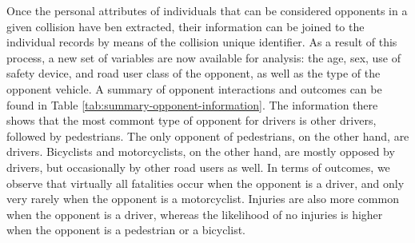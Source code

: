 \documentclass[]{elsarticle} %
\begin{document}
Once the personal attributes of individuals that can be considered
opponents in a given collision have ben extracted, their information can
be joined to the individual records by means of the collision unique
identifier. As a result of this process, a new set of variables are now
available for analysis: the age, sex, use of safety device, and road
user class of the opponent, as well as the type of the opponent vehicle.
A summary of opponent interactions and outcomes can be found in Table
\ref{tab:summary-opponent-information}. The information there shows that
the most commont type of opponent for drivers is other drivers, followed
by pedestrians. The only opponent of pedestrians, on the other hand, are
drivers. Bicyclists and motorcyclists, on the other hand, are mostly
opposed by drivers, but occasionally by other road users as well. In
terms of outcomes, we observe that virtually all fatalities occur when
the opponent is a driver, and only very rarely when the opponent is a
motorcyclist. Injuries are also more common when the opponent is a
driver, whereas the likelihood of no injuries is higher when the
opponent is a pedestrian or a bicyclist.
\end{document}
